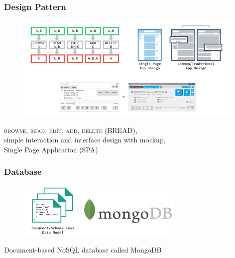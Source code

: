 \documentclass[10pt, compress]{beamer}
\begin{document}

\begin{frame}[fragile]
  \frametitle{Design Pattern}
  \centering

  \begin{figure}[ht]
    \vspace{-1cm}
    \includegraphics[width=11cm]{include/literature-design-pattern.png}
  \end{figure}

  \textsc{browse, read, edit, add, delete} (\alert{BREAD}),\\
  simple interaction and interface design with mockup,\\
  Single Page Application (\alert{SPA})

\end{frame}


\begin{frame}[fragile]
  \frametitle{Database}
  \centering

  \begin{figure}[ht]
    \vspace{-1cm}
    \includegraphics[width=8cm]{include/literature-database.png}
  \end{figure}

  Document-based \alert{NoSQL} database called \alert{MongoDB}

\end{frame}

\end{document}
